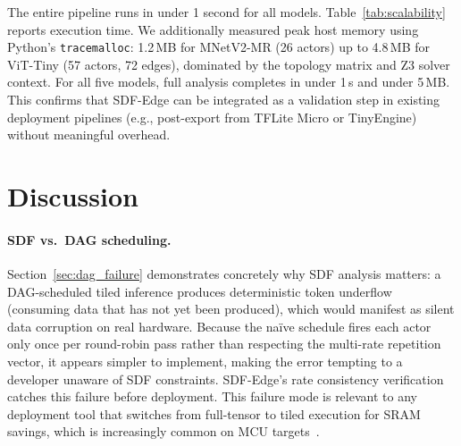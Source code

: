 \documentclass[journal]{IEEEtran}
\begin{document}
\begin{table}[htbp]
\centering
\caption{Framework Scalability (median of 100 runs)}
\label{tab:scalability}
\end{table}

The entire pipeline runs in under 1 second for all models.
Table~\ref{tab:scalability} reports execution time. We additionally measured peak host memory using Python's \texttt{tracemalloc}: 1.2\,MB for MNetV2-MR (26 actors) up to 4.8\,MB for ViT-Tiny (57 actors, 72 edges), dominated by the topology matrix and Z3 solver context. For all five models, full analysis completes in under 1\,s and under 5\,MB. This confirms that SDF-Edge can be integrated as a validation step in existing deployment pipelines (e.g., post-export from TFLite Micro or TinyEngine) without meaningful overhead.

\section{Discussion}

\paragraph{SDF vs.\ DAG scheduling.}
Section~\ref{sec:dag_failure} demonstrates concretely why SDF analysis matters: a DAG-scheduled tiled inference produces deterministic token underflow (consuming data that has not yet been produced), which would manifest as silent data corruption on real hardware. Because the na\"ive schedule fires each actor only once per round-robin pass rather than respecting the multi-rate repetition vector, it appears simpler to implement, making the error tempting to a developer unaware of SDF constraints. SDF-Edge's rate consistency verification catches this failure before deployment.
This failure mode is relevant to any deployment tool that switches from full-tensor to tiled execution for SRAM savings, which is increasingly common on MCU targets~\cite{burrello2021dory,lin2020mcunet}.
\end{document}
